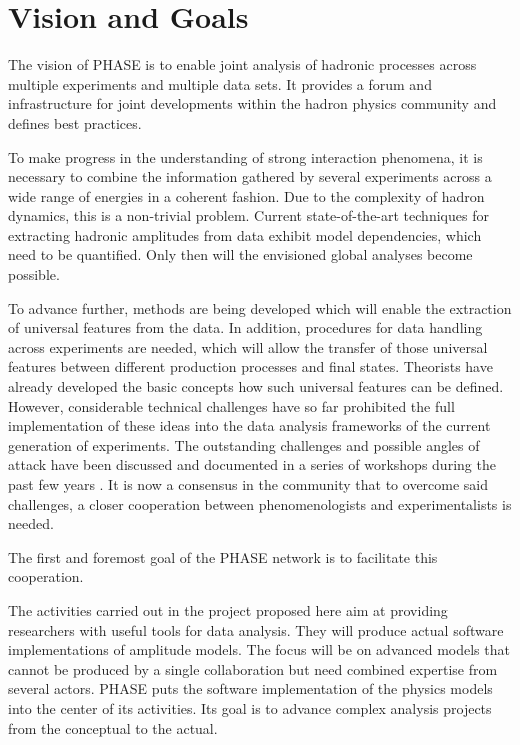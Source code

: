 \section{Vision and Goals}

The vision of PHASE is to enable joint analysis of hadronic processes across multiple experiments and multiple data sets. It provides a forum and infrastructure for joint developments within the hadron physics community and defines best practices.

To make progress in the understanding of strong interaction phenomena, it is necessary to combine the information gathered by several experiments across a wide range of energies in a coherent fashion. Due to the complexity of hadron dynamics, this is a non-trivial problem. Current state-of-the-art techniques for extracting hadronic amplitudes from data exhibit model dependencies, which need to be quantified. Only then will the envisioned global analyses become possible.

To advance further, methods are being developed which will enable the extraction of universal features from the data. In addition, procedures for data handling across experiments are needed, which will allow the transfer of those universal features between different production processes and final states. Theorists have already developed the basic concepts how such universal features can be defined. However, considerable technical challenges have so far prohibited the full implementation of these ideas into the data analysis frameworks of the current generation of experiments. The outstanding challenges and possible angles of attack have been discussed and documented in a series of workshops during the past few years \cite{Battaglieri_2015, Brice_o_2016, Lutz_2016}. It is now a consensus in the community that to overcome said challenges, a closer cooperation between phenomenologists and experimentalists is needed.

The first and foremost goal of the PHASE network is to facilitate this cooperation. 

The activities carried out in the project proposed here aim at providing researchers with useful tools for data analysis. They will produce actual software implementations of amplitude models. The focus will be on advanced models that cannot be produced by a single collaboration but need combined expertise from several actors. PHASE puts the software implementation of the physics models into the center of its activities. Its goal is to advance complex analysis projects from the conceptual to the actual.





